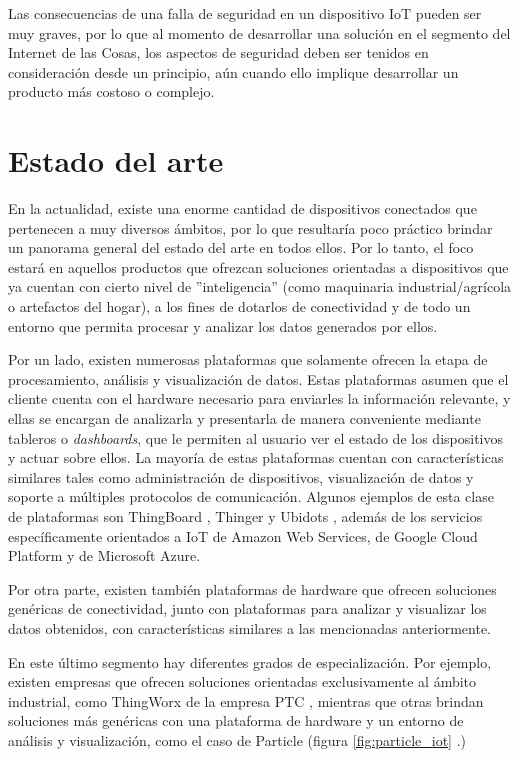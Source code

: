 Las consecuencias de una falla de seguridad en un dispositivo IoT pueden ser muy graves, por lo que al momento de desarrollar una solución en el segmento del Internet de las Cosas, los aspectos de seguridad deben ser tenidos en consideración desde un principio, aún cuando ello implique desarrollar un producto más costoso o complejo.

\section{Estado del arte{}}
\label{sec:estado_del_arte}

En la actualidad, existe una enorme cantidad de dispositivos conectados que pertenecen a muy diversos ámbitos, por lo que resultaría poco práctico brindar un panorama general del estado del arte en todos ellos. Por lo tanto, el foco estará en aquellos productos que ofrezcan soluciones orientadas a dispositivos que ya cuentan con cierto nivel de ''inteligencia'' (como maquinaria industrial/agrícola o artefactos del hogar), a los fines de dotarlos de conectividad y de todo un entorno que permita procesar y analizar los datos generados por ellos.

Por un lado, existen numerosas plataformas que solamente ofrecen la etapa de procesamiento, análisis y visualización de datos. Estas plataformas asumen que el cliente cuenta con el hardware necesario para enviarles la información relevante, y ellas se encargan de analizarla y presentarla de manera conveniente mediante tableros o \emph{dashboards}, que le permiten al usuario ver el estado de los dispositivos y actuar sobre ellos. La mayoría de estas plataformas cuentan con características similares tales como administración de dispositivos, visualización de datos y soporte a múltiples protocolos de comunicación. Algunos ejemplos de esta clase de plataformas son ThingBoard \citep{7}, Thinger \citep{8} y Ubidots \citep{9}, además de los servicios específicamente orientados a IoT de Amazon Web Services, de Google Cloud Platform y de Microsoft Azure.  

Por otra parte, existen también plataformas de hardware que ofrecen soluciones genéricas de conectividad, junto con plataformas para analizar y visualizar los datos obtenidos, con características similares a las mencionadas anteriormente.

En este último segmento hay diferentes grados de especialización. Por ejemplo, existen empresas que ofrecen soluciones orientadas exclusivamente al ámbito industrial, como ThingWorx de la empresa PTC \citep{10}, mientras que otras brindan soluciones más genéricas con una plataforma de hardware y un entorno de análisis y visualización, como el caso de Particle (figura \ref{fig:particle_iot} \citep{11}.)

